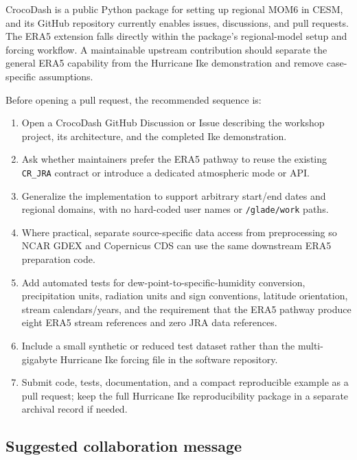 \documentclass[11pt]{article}
\newcommand{\code}[1]{\texttt{#1}}
\begin{document}
CrocoDash is a public Python package for setting up regional MOM6 in CESM, and its GitHub repository currently enables issues, discussions, and pull requests. The ERA5 extension falls directly within the package's regional-model setup and forcing workflow. A maintainable upstream contribution should separate the general ERA5 capability from the Hurricane Ike demonstration and remove case-specific assumptions.

Before opening a pull request, the recommended sequence is:

\begin{enumerate}
  \item Open a CrocoDash GitHub Discussion or Issue describing the workshop project, its architecture, and the completed Ike demonstration.
  \item Ask whether maintainers prefer the ERA5 pathway to reuse the existing \code{CR\_JRA} contract or introduce a dedicated atmospheric mode or API.
  \item Generalize the implementation to support arbitrary start/end dates and regional domains, with no hard-coded user names or \code{/glade/work} paths.
  \item Where practical, separate source-specific data access from preprocessing so NCAR GDEX and Copernicus CDS can use the same downstream ERA5 preparation code.
  \item Add automated tests for dew-point-to-specific-humidity conversion, precipitation units, radiation units and sign conventions, latitude orientation, stream calendars/years, and the requirement that the ERA5 pathway produce eight ERA5 stream references and zero JRA data references.
  \item Include a small synthetic or reduced test dataset rather than the multi-gigabyte Hurricane Ike forcing file in the software repository.
  \item Submit code, tests, documentation, and a compact reproducible example as a pull request; keep the full Hurricane Ike reproducibility package in a separate archival record if needed.
\end{enumerate}

\subsection{Suggested collaboration message}
\end{document}
